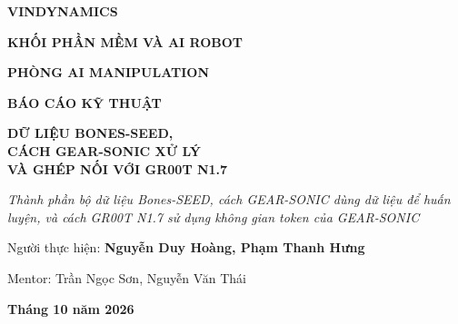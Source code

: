\documentclass[12pt,a4paper,oneside]{report}
\begin{document}
\begin{titlepage}
\centering
\vspace*{0.5cm}
{\large\bfseries VINDYNAMICS\par}
\vspace{0.15cm}
{\bfseries KHỐI PHẦN MỀM VÀ AI ROBOT\par}
\vspace{0.1cm}
{\bfseries PHÒNG AI MANIPULATION\par}
\vspace{4cm}
{\Large\bfseries\color{navy} BÁO CÁO KỸ THUẬT\par}
\vspace{0.8cm}
{\huge\bfseries\color{navy} DỮ LIỆU BONES-SEED,\\[0.3cm] CÁCH GEAR-SONIC XỬ LÝ\\[0.3cm] VÀ GHÉP NỐI VỚI GR00T N1.7\par}
\vspace{0.8cm}
{\large\itshape Thành phần bộ dữ liệu Bones-SEED, cách GEAR-SONIC dùng dữ liệu để huấn luyện, và cách GR00T N1.7 sử dụng không gian token của GEAR-SONIC\par}
\vfill
{\large Người thực hiện: \textbf{Nguyễn Duy Hoàng, Phạm Thanh Hưng}\par}
\vspace{0.3cm}
{\large Mentor: Trần Ngọc Sơn, Nguyễn Văn Thái\par}
\vspace{3cm}
{\large\bfseries Tháng 10 năm 2026\par}
\vspace{0.5cm}
\end{titlepage}
\end{document}
